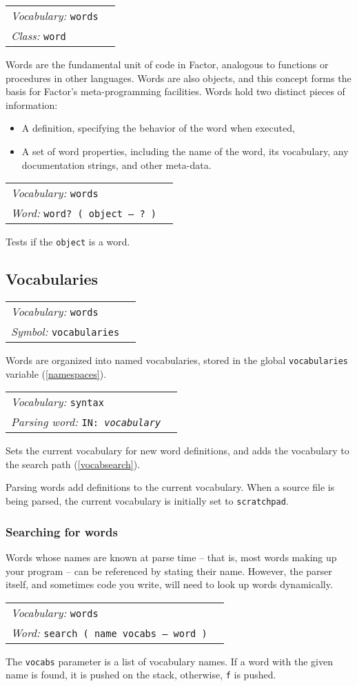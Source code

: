 \documentclass{book}
\newcommand{\vocabulary}[1]{\emph{Vocabulary:} \texttt{#1}&\\}
\newcommand{\parsingword}[2]{\index{\texttt{#1}}\emph{Parsing word:} \texttt{#2}&\\}
\newcommand{\ordinaryword}[2]{\index{\texttt{#1}}\emph{Word:} \texttt{#2}&\\}
\newcommand{\symbolword}[1]{\index{\texttt{#1}}\emph{Symbol:} \texttt{#1}&\\}
\newcommand{\classword}[1]{\index{\texttt{#1}}\emph{Class:} \texttt{#1}&\\}
\newcommand{\wordtable}[1]{


\begin{tabularx}{12cm}{lX}
\hline
#1
\hline
\end{tabularx}

}
\begin{document}
\wordglos
\vocabglos
\newcommand{\definingwordglos}{\glossary{name=defining word,
description=a word that adds definitions to the dictionary}}
\wordtable{
\vocabulary{words}
\classword{word}
}
Words are the fundamental unit of code in Factor, analogous to functions or procedures in other languages. Words are also objects, and this concept forms the basis for Factor's meta-programming facilities. Words hold two distinct pieces of information:
\begin{itemize}
\item A definition, specifying the behavior of the word when executed,
\item A set of word properties, including the name of the word, its vocabulary, any documentation strings, and other meta-data.
\end{itemize}
\wordtable{
\vocabulary{words}
\ordinaryword{word?}{word?~( object -- ?~)}
}
Tests if the \texttt{object} is a word.

\subsection{Vocabularies}
\wordtable{
\vocabulary{words}
\symbolword{vocabularies}
}
Words are organized into named vocabularies, stored in the global \texttt{vocabularies} variable (\ref{namespaces}).
\wordtable{
\vocabulary{syntax}
\parsingword{IN:}{IN:~\emph{vocabulary}}
}
Sets the current vocabulary for new word definitions, and adds the vocabulary to the search path (\ref{vocabsearch}).

Parsing words add definitions to the current vocabulary. When a source file is being parsed, the current vocabulary is initially set to \texttt{scratchpad}.

\subsubsection{Searching for words}

Words whose names are known at parse time -- that is, most words making up your program -- can be referenced by stating their name. However, the parser itself, and sometimes code you write, will need to look up words dynamically.
\wordtable{
\vocabulary{words}
\ordinaryword{search}{search ( name vocabs -- word )}

}
The \texttt{vocabs} parameter is a list of vocabulary names. If a word with the given name is found, it is pushed on the stack, otherwise, \texttt{f} is pushed.
\end{document}
